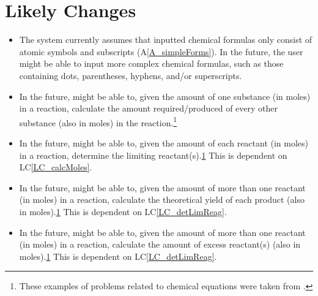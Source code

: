 \documentclass[12pt]{article}
\newcommand{\aref}[1]{A\ref{#1}}
\newcounter{lcnum} %
\newcommand{\lcref}[1]{LC\ref{#1}}
\begin{document}
\newpage

\section{Likely Changes} \label{sec_LCs}

\begin{itemize}

  \item[LC\refstepcounter{lcnum}\thelcnum\label{LC_complexForms}:] The system
    currently assumes that inputted chemical formulas only consist of atomic
    symbols and subscripts (\aref{A_simpleForms}).  In the future, the user
    might be able to input more complex chemical formulas, such as those
    containing dots, parentheses, hyphens, and/or superscripts.

  \item[LC\refstepcounter{lcnum}\thelcnum\label{LC_calcMoles}:] In the future,
    \progname{} might be able to, given the amount of one substance (in moles)
    in a reaction, calculate the amount required/produced of every other
    substance (also in moles) in the reaction.\footnote{
      \label{chemProbExs}These examples of problems related to
      chemical equations were taken from \cite{lund_introduction_2023}.}

  \item[LC\refstepcounter{lcnum}\thelcnum\label{LC_detLimReag}:] In the future,
    \progname{} might be able to, given the amount
    of each reactant (in moles) in a reaction,
    determine the limiting reactant(s).\cref{chemProbExs}
    This is dependent on \lcref{LC_calcMoles}.

  \item[LC\refstepcounter{lcnum}\thelcnum\label{LC_calcYield}:] In the future,
    \progname{} might be able to, given the amount
    of more than one reactant (in moles) in a reaction,
    calculate the theoretical yield of each product (also in
    moles).\cref{chemProbExs} This is dependent on \lcref{LC_detLimReag}.

  \item[LC\refstepcounter{lcnum}\thelcnum\label{LC_calcExcess}:] In the future,
    \progname{} might be able to, given the amount
    of more than one reactant (in moles) in a reaction,
    calculate the amount of excess reactant(s) (also in	moles).\cref{chemProbExs}
    This is dependent on \lcref{LC_detLimReag}.


\end{itemize}
\end{document}

